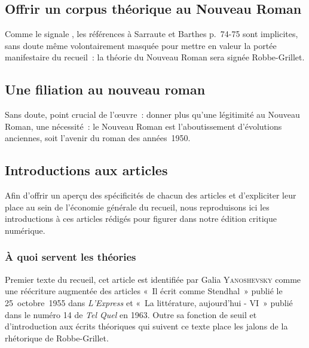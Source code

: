 \documentclass[12pt, a4paper]{article}
\begin{document}
    


\subsection{Offrir un corpus théorique au Nouveau Roman}

Comme le signale \galia, les références à Sarraute et Barthes p.~74-75 sont implicites, sans doute même volontairement masquée pour mettre en valeur la portée manifestaire du recueil~: la théorie du Nouveau Roman sera signée Robbe-Grillet.



\subsection{Une filiation au nouveau roman}


Sans doute, point crucial de l'œuvre~: donner plus qu'une légitimité au Nouveau Roman, une nécessité~: le Nouveau Roman est l'aboutissement d'évolutions anciennes, soit l'avenir du roman des années~1950.

\subsection{Introductions aux articles}

Afin d'offrir un aperçu des spécificités de chacun des articles et d'expliciter leur place au sein de l'économie générale du recueil, nous reproduisons ici les introductions à ces articles rédigés pour figurer dans notre édition critique numérique.



\subsubsection{À quoi servent les théories}
Premier texte du recueil, cet article est identifiée par Galia \textsc{Yanoshevsky} comme une réécriture augmentée des articles «~Il écrit comme Stendhal~» publié le 25~octobre~1955 dans \textit{L'Express} et «~La littérature, aujourd'hui - VI~» publié dans le numéro 14 de \textit{Tel Quel} en 1963. Outre sa fonction de seuil et d'introduction aux écrits théoriques qui suivent ce texte place les jalons de la rhétorique de Robbe-Grillet.
\end{document}
